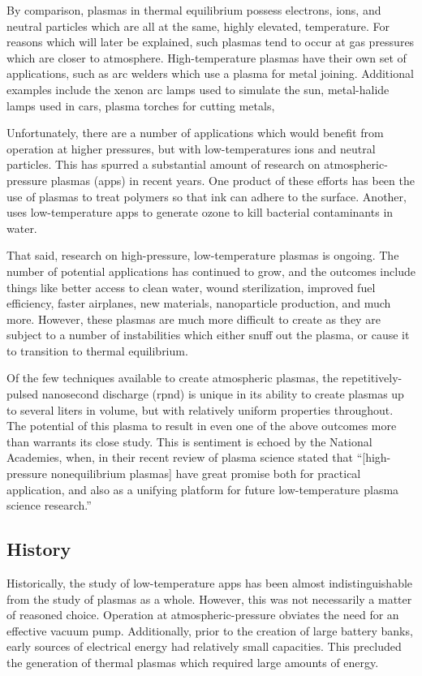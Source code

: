By comparison, plasmas in thermal equilibrium possess electrons, ions, and
neutral particles which are all at the same, highly elevated, temperature. For
reasons which will later be explained, such plasmas tend to occur at gas
pressures which are closer to atmosphere. High-temperature plasmas have their
own set of applications, such as arc welders which use a plasma for metal
joining. Additional examples include the xenon arc lamps used to simulate the
sun, metal-halide lamps used in cars, plasma torches for cutting metals,

Unfortunately, there are a number of applications which would benefit from
operation at higher pressures, but with low-temperatures ions and neutral
particles. This has spurred a substantial amount of research on
atmospheric-pressure plasmas (\acs{app}s) in recent years. One product of these
efforts has been the use of plasmas to treat polymers so that ink can adhere to
the surface. Another, uses low-temperature \acs{app}s to generate ozone to kill
bacterial contaminants in water.

That said, research on high-pressure, low-temperature plasmas is ongoing. The
number of potential applications has continued to grow, and the outcomes include
things like better access to clean water, wound sterilization, improved fuel
efficiency, faster airplanes, new materials, nanoparticle production, and much
more. However, these plasmas are much more difficult to create as they are
subject to a number of instabilities which either snuff out the plasma, or cause
it to transition to thermal equilibrium.

Of the few techniques available to create atmospheric plasmas, the
repetitively-pulsed nanosecond discharge (\acs{rpnd}) is unique in its ability
to create plasmas up to several liters in volume, but with relatively uniform
properties throughout. The potential of this plasma to result in even one of the
above outcomes more than warrants its close study. This is sentiment is echoed
by the National Academies, when, in their recent review of plasma science stated
that ``[high-pressure nonequilibrium plasmas] have great promise both for
practical application, and also as a unifying platform for future
low-temperature plasma science research.''

\subsection{History}

Historically, the study of low-temperature \acs{app}s has been almost
indistinguishable from the study of plasmas as a whole. However, this was not
necessarily a matter of reasoned choice. Operation at atmospheric-pressure
obviates the need for an effective vacuum pump. Additionally, prior to the
creation of large battery banks, early sources of electrical energy had
relatively small capacities. This precluded the generation of thermal plasmas
which required large amounts of energy.

